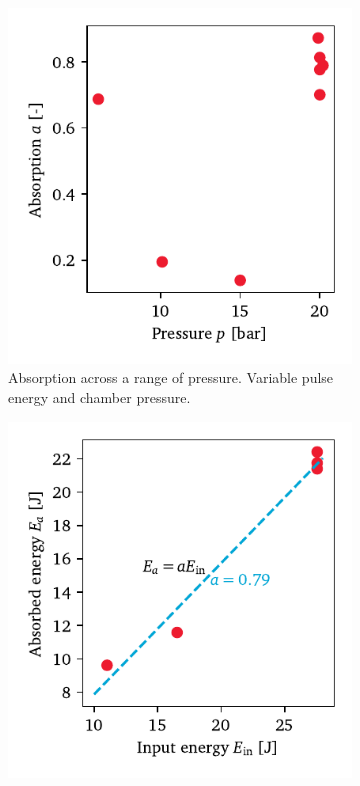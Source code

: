             \begin{figure}[h]
                \centering
                \begin{subfigure}[t]{0.47\textwidth}
                    \centering
                    \includegraphics[width=\textwidth]{assets/5 results/absorption_ia}
                    \caption{Absorption across a range of pressure. Variable pulse energy and chamber pressure.}
                    \label{fig:absorption_ap}
                \end{subfigure}
                \hfill
                \begin{subfigure}[t]{0.47\textwidth}
                    \centering
                    \includegraphics[width=\textwidth]{assets/5 results/absorption_20bar}

\end{subfigure}
\end{figure}
